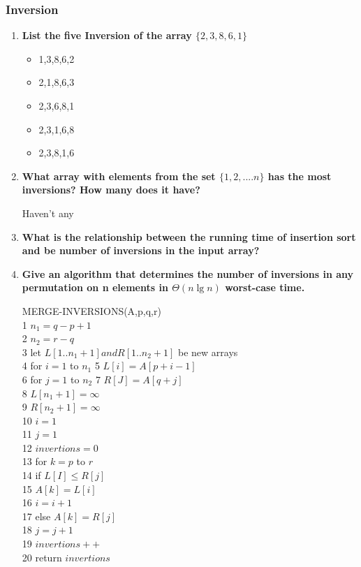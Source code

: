 \documentclass[a4paper,12pt]{article}
\begin{document}
    \subsubsection{Inversion}
    
    \begin{enumerate}
     \item \textbf{List the five Inversion of the array $\{2,3,8,6,1\}$}
	\begin{itemize}
	 \item 1,3,8,6,2
	 \item 2,1,8,6,3
	 \item 2,3,6,8,1
	 \item 2,3,1,6,8
	 \item 2,3,8,1,6
	\end{itemize}
    \item \textbf{What array with elements from the set $\{1,2,....n\}$
    has the most inversions? How many does it have?}
    
    Haven't any
    
    \item \textbf{What is the relationship between the running time of
    insertion sort and be number of inversions in the input array?}
    
    \item \textbf{Give an algorithm that determines the number of inversions in
    any permutation on n elements in $\Theta(n\lg n)$ worst-case time.}
    
    MERGE-INVERSIONS(A,p,q,r) \\
    1 $n_{1} = q-p+1$ \\
    2 $n_{2} = r-q$ \\
    3 let $L[1..n_{1} + 1] and R[1..n_{2} + 1]$ be new arrays \\
    4 for $i = 1$ to $n_{1}$
    5 \hspace{0.5cm} $L[i] = A[p+i-1]$ \\
    6 for $j = 1 $ to $n_{2}$
    7 \hspace{0.5cm} $R[J] = A[q+j]$ \\
    8 $L[n_{1}+1] = \infty$ \\
    9 $R[n_{2}+1] = \infty$ \\
    10 $i = 1$ \\
    11 $j = 1$ \\
    12 $invertions = 0$ \\
    13 for $k = p$ to $r$ \\
    14 \hspace{0.5cm} if $L[I] \leq R[j]$ \\
    15 \hspace{1cm} $A[k] = L[i]$ \\
    16 \hspace{1cm} $i = i + 1$ \\
    17 \hspace{0.5cm} else $A[k] = R[j]$ \\
    18 \hspace{1cm} $j = j + 1$ \\
    19 \hspace{1cm} $invertions++$ \\
    20 return $invertions$ \\
    

\end{enumerate}
\end{document}
